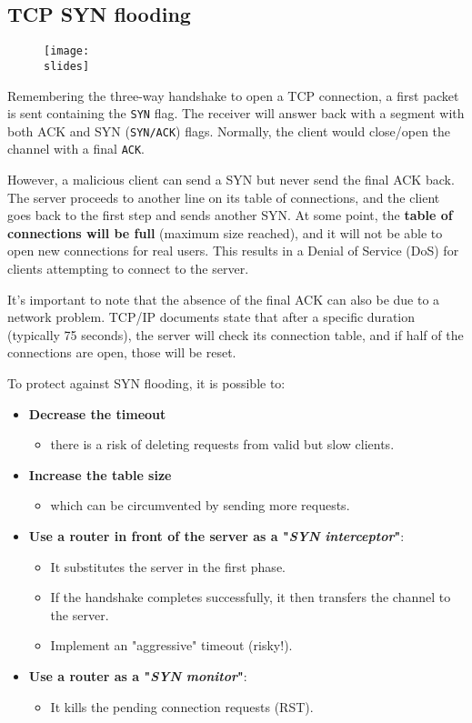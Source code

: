 \subsection{TCP SYN flooding}
\begin{figure}[h]
    \centering
    \texttt{[image: \\slides]}
\end{figure}
Remembering the three-way handshake to open a TCP connection, a first packet is sent containing the \texttt{SYN} flag. The receiver will answer back with a segment with both ACK and SYN  (\texttt{SYN/ACK}) flags. Normally, the client would close/open the channel with a final \texttt{ACK}.

However, a malicious client can send a SYN but never send the final ACK back. The server proceeds to another line on its table of connections, and the client goes back to the first step and sends another SYN. At some point, the \textbf{table of connections will be full} (maximum size reached), and it will not be able to open new connections for real users. This results in a Denial of Service (DoS) for clients attempting to connect to the server.

It's important to note that the absence of the final ACK can also be due to a network problem. TCP/IP documents state that after a specific duration (typically 75 seconds), the server will check its connection table, and if half of the connections are open, those will be reset.


To protect against SYN flooding, it is possible to:
\begin{itemize}
    \item \textbf{Decrease the timeout}
          \begin{itemize}
              \item there is a risk of deleting requests from valid but slow clients.
          \end{itemize}
    \item \textbf{Increase the table size }
          \begin{itemize}
              \item which can be circumvented by sending more requests.
          \end{itemize}
    \item \textbf{Use a router in front of the server as a "\emph{SYN interceptor}"}:
          \begin{itemize}
              \item It substitutes the server in the first phase.
              \item If the handshake completes successfully, it then transfers the channel to the server.
              \item Implement an "aggressive" timeout (risky!).
          \end{itemize}
    \item \textbf{Use a router as a "\emph{SYN monitor}"}:
          \begin{itemize}
              \item It kills the pending connection requests (RST).
          \end{itemize}
\end{itemize}

